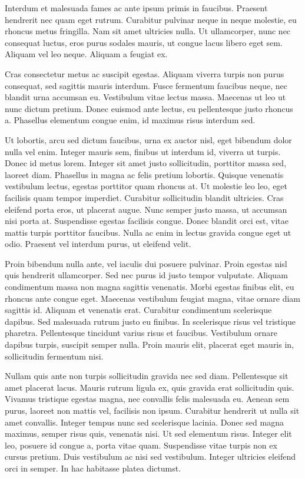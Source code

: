 \documentclass[10pt,twocolumn]{article}
\begin{document}
Interdum et malesuada fames ac ante ipsum primis in faucibus. Praesent hendrerit nec quam eget rutrum. Curabitur pulvinar neque in neque molestie, eu rhoncus metus fringilla. Nam sit amet ultricies nulla. Ut ullamcorper, nunc nec consequat luctus, eros purus sodales mauris, ut congue lacus libero eget sem. Aliquam vel leo neque. Aliquam a feugiat ex.

Cras consectetur metus ac suscipit egestas. Aliquam viverra turpis non purus consequat, sed sagittis mauris interdum. Fusce fermentum faucibus neque, nec blandit urna accumsan eu. Vestibulum vitae lectus massa. Maecenas ut leo ut nunc dictum pretium. Donec euismod ante lectus, eu pellentesque justo rhoncus a. Phasellus elementum congue enim, id maximus risus interdum sed.

Ut lobortis, arcu sed dictum faucibus, urna ex auctor nisl, eget bibendum dolor nulla vel enim. Integer mauris sem, finibus ut interdum id, viverra ut turpis. Donec id metus lorem. Integer sit amet justo sollicitudin, porttitor massa sed, laoreet diam. Phasellus in magna ac felis pretium lobortis. Quisque venenatis vestibulum lectus, egestas porttitor quam rhoncus at. Ut molestie leo leo, eget facilisis quam tempor imperdiet. Curabitur sollicitudin blandit ultricies. Cras eleifend porta eros, ut placerat augue. Nunc semper justo massa, ut accumsan nisi porta at. Suspendisse egestas facilisis congue. Donec blandit orci est, vitae mattis turpis porttitor faucibus. Nulla ac enim in lectus gravida congue eget ut odio. Praesent vel interdum purus, ut eleifend velit.

Proin bibendum nulla ante, vel iaculis dui posuere pulvinar. Proin egestas nisl quis hendrerit ullamcorper. Sed nec purus id justo tempor vulputate. Aliquam condimentum massa non magna sagittis venenatis. Morbi egestas finibus elit, eu rhoncus ante congue eget. Maecenas vestibulum feugiat magna, vitae ornare diam sagittis id. Aliquam et venenatis erat. Curabitur condimentum scelerisque dapibus. Sed malesuada rutrum justo eu finibus. In scelerisque risus vel tristique pharetra. Pellentesque tincidunt varius risus et faucibus. Vestibulum ornare dapibus turpis, suscipit semper nulla. Proin mauris elit, placerat eget mauris in, sollicitudin fermentum nisi.

Nullam quis ante non turpis sollicitudin gravida nec sed diam. Pellentesque sit amet placerat lacus. Mauris rutrum ligula ex, quis gravida erat sollicitudin quis. Vivamus tristique egestas magna, nec convallis felis malesuada eu. Aenean sem purus, laoreet non mattis vel, facilisis non ipsum. Curabitur hendrerit ut nulla sit amet convallis. Integer tempus nunc sed scelerisque lacinia. Donec sed magna maximus, semper risus quis, venenatis nisi. Ut sed elementum risus. Integer elit leo, posuere id congue a, porta vitae quam. Suspendisse vitae turpis non ex cursus pretium. Duis vestibulum ac nisi sed vestibulum. Integer ultricies eleifend orci in semper. In hac habitasse platea dictumst.
\end{document}
